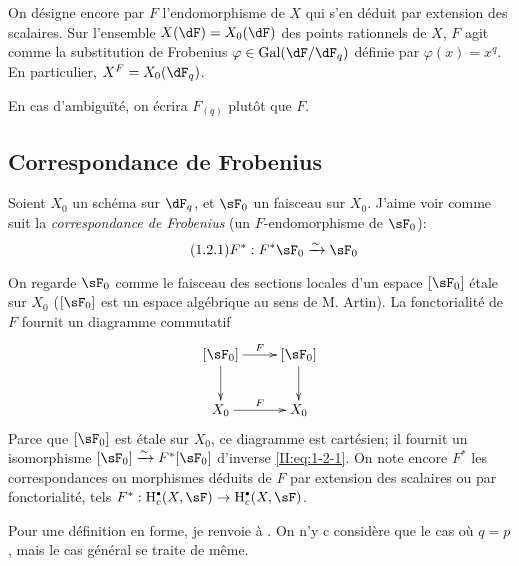 On désigne encore par $F$ l'endomorphisme de $X$ qui s'en déduit par 
extension des scalaires. Sur l'ensemble $X(\dF) = X_0(\dF)$ des points 
rationnels de $X$, $F$ agit comme la substitution de Frobenius 
$\varphi\in\gal(\dF/\dF_q)$ définie par $\varphi(x)=x^q$. En particulier, 
$X^F=X_0(\dF_q)$. 

En cas d'ambiguïté, on écrira $F_{(q)}$ plutôt que $F$. 










\subsection{Correspondance de Frobenius}\label{II:1-2}

Soient $X_0$ un schéma sur $\dF_q$, et $\sF_0$ un faisceau sur $X_0$. J'aime 
voir comme suit la \emph{correspondance de Frobenius} (un $F$-endomorphisme de 
$\sF_0$): 
\begin{equation*}\tag{1.2.1}\label{II:eq:1-2-1}
  F^* : F^*\sF_0 \iso \sF_0
\end{equation*}

On regarde $\sF_0$ comme le faisceau des sections locales d'un espace 
$[\sF_0]$ étale sur $X_0$ ($[\sF_0]$ est un espace algébrique au sens de M. 
Artin). La fonctorialité de $F$ fournit un diagramme commutatif 
\[\xymatrix{
  [\sF_0] \ar[r]^-F \ar[d]
    & [\sF_0] \ar[d] \\
  X_0 \ar[r]^F 
    & X_0
}\]
Parce que $[\sF_0]$ est étale sur $X_0$, ce diagramme est cartésien; il fournit 
un isomorphisme $[\sF_0]\iso F^*[\sF_0]$ d'inverse \eqref{II:eq:1-2-1}. On note 
encore $F^*$ les correspondances ou morphismes déduits de $F$ par extension 
des scalaires ou par fonctorialité, tels 
$F^*:\h_c^\bullet(X,\sF)\to \h_c^\bullet(X,\sF)$. 

Pour une définition en forme, je renvoie à \cite[XI.1,2]{sga5}. On n'y c
considère que le cas où $q=p$, mais le cas général se traite de même. 





\subsection{}\label{II:1-3}

